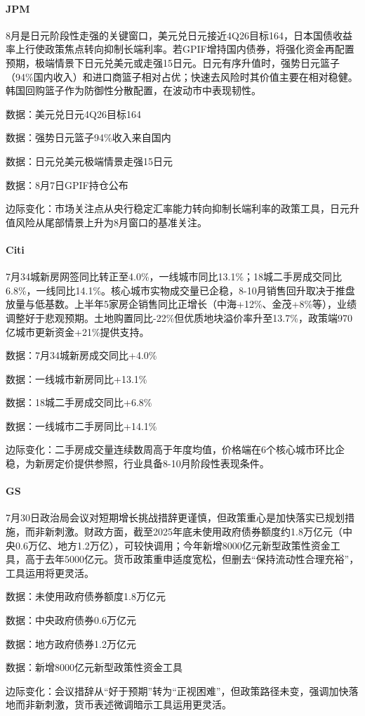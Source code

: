 \documentclass[11pt]{ctexart}
\begin{document}
\paragraph{JPM} 8月是日元阶段性走强的关键窗口，美元兑日元接近4Q26目标164，日本国债收益率上行使政策焦点转向抑制长端利率。若GPIF增持国内债券，将强化资金再配置预期，极端情景下日元兑美元或走强15日元。日元有序升值时，强势日元篮子（94\%国内收入）和进口商篮子相对占优；快速去风险时其价值主要在相对稳健。韩国回购篮子作为防御性分散配置，在波动市中表现韧性。
{\small\color{refgray}数据：美元兑日元4Q26目标164\par}
{\small\color{refgray}数据：强势日元篮子94\%收入来自国内\par}
{\small\color{refgray}数据：日元兑美元极端情景走强15日元\par}
{\small\color{refgray}数据：8月7日GPIF持仓公布\par}
{\small\color{refgray}边际变化：市场关注点从央行稳定汇率能力转向抑制长端利率的政策工具，日元升值风险从尾部情景上升为8月窗口的基准关注。\par}
\paragraph{Citi} 7月34城新房网签同比转正至4.0\%，一线城市同比13.1\%；18城二手房成交同比6.8\%，一线同比14.1\%。核心城市实物成交量已企稳，8-10月销售回升取决于推盘放量与低基数。上半年5家房企销售同比正增长（中海+12\%、金茂+8\%等），业绩调整好于悲观预期。土地购置同比-22\%但优质地块溢价率升至13.7\%，政策端970亿城市更新资金+21\%提供支持。
{\small\color{refgray}数据：7月34城新房成交同比+4.0\%\par}
{\small\color{refgray}数据：一线城市新房同比+13.1\%\par}
{\small\color{refgray}数据：18城二手房成交同比+6.8\%\par}
{\small\color{refgray}数据：一线城市二手房同比+14.1\%\par}
{\small\color{refgray}边际变化：二手房成交量连续数周高于年度均值，价格端在6个核心城市环比企稳，为新房定价提供参照，行业具备8-10月阶段性表现条件。\par}
\paragraph{GS} 7月30日政治局会议对短期增长挑战措辞更谨慎，但政策重心是加快落实已规划措施，而非新刺激。财政方面，截至2025年底未使用政府债券额度约1.8万亿元（中央0.6万亿、地方1.2万亿），可较快调用；今年新增8000亿元新型政策性资金工具，高于去年5000亿元。货币政策重申适度宽松，但删去“保持流动性合理充裕”，工具运用将更灵活。
{\small\color{refgray}数据：未使用政府债券额度1.8万亿元\par}
{\small\color{refgray}数据：中央政府债券0.6万亿元\par}
{\small\color{refgray}数据：地方政府债券1.2万亿元\par}
{\small\color{refgray}数据：新增8000亿元新型政策性资金工具\par}
{\small\color{refgray}边际变化：会议措辞从“好于预期”转为“正视困难”，但政策路径未变，强调加快落地而非新刺激，货币表述微调暗示工具运用更灵活。\par}
\end{document}
